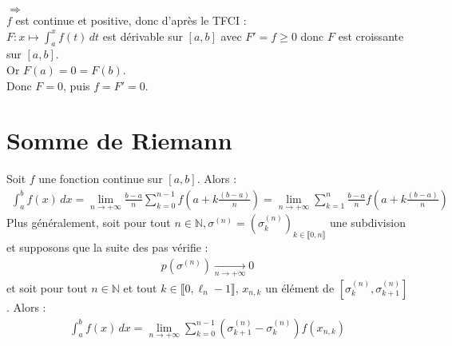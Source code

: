 \documentclass[../main.tex]{subfiles}
\begin{document}
$\boxed{\Rightarrow}$ \\
$f$ est continue et positive, donc d'après le TFCI : \\
$F:x\mapsto \int_{a}^{x} f(t) \,dt$ est dérivable sur $[a, b]$ avec $F' = f \geq 0$ donc $F$ est croissante sur $[a, b]$. \\
Or $F(a) = 0 = F(b)$. \\
Donc $F = 0$, puis $f = F' = 0$. 

\section{Somme de Riemann}
\begin{tcolorbox}[title=Théorème 26.70, title filled=false, colframe=orange, colback=orange!10!white]
    Soit $f$ une fonction continue sur $[a, b]$. Alors : 
    \begin{align*}
        \int_{a}^{b} f(x) \,dx = \lim_{n\to +\infty} \frac{b - a}{n} \sum_{k=0}^{n-1} f\left(a + k\frac{(b-a)}{n}\right) = \lim_{n\to +\infty} \sum_{k=1}^{n} \frac{b-a}{n} f\left(a + k\frac{(b-a)}{n}\right) 
    \end{align*}
    Plus généralement, soit pour tout $n\in \mathbb{N}, \sigma^{(n)} = (\sigma^{(n)}_k)_{k\in \llbracket 0, n \rrbracket}$ une subdivision et supposons que la suite des pas vérifie : 
    \begin{align*}
        p(\sigma^{(n)}) \underset{n \to +\infty}{\longrightarrow} 0
    \end{align*}
    et soit pour tout $n\in \mathbb{N}$ et tout $k\in \llbracket 0, \ell_n - 1 \rrbracket$, $x_{n,k}$ un élément de $[\sigma_k^{(n)}, \sigma_{k+1}^{(n)}]$. Alors :
    \begin{align*}
        \int_{a}^{b} f(x) \,dx = \lim_{n\to +\infty} \sum_{k=0}^{n-1} (\sigma_{k+1}^{(n)} - \sigma_k^{(n)}) f(x_{n,k}) 
    \end{align*}
\end{tcolorbox}
\end{document}
